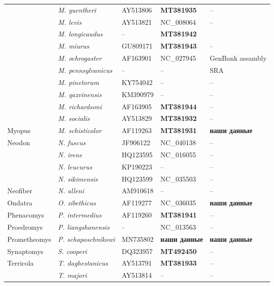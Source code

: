 \begin{landscape}
\begin{center}
\begin{longtable}{|p{3.5cm}|p{4.5cm}|p{4.0cm}|p{6.5cm}|p{4.5cm}|}
& \textit{M. guentheri} & AY513806 & \textbf{MT381935} & --\\ \cline{2-5}
& \textit{M. levis} & AY513821 & NC\_008064 & --\\ \cline{2-5}
& \textit{M. longicaudus} & -- & \textbf{MT381942} & \\ \cline{2-5}
& \textit{M. miurus} & GU809171 & \textbf{MT381943} & --\\ \cline{2-5}
& \textit{M. ochrogaster} & AF163901 & NC\_027945 & GenBank assambly\\ \cline{2-5}
& \textit{M. pennsylvanicus} & -- & -- & SRA\\ \cline{2-5}
& \textit{M. pinetorum} & KY754042 & -- & --\\ \cline{2-5}
& \textit{M. qazvinensis} & KM390979 & -- & --\\ \cline{2-5}
& \textit{M. richardsoni} & AF163905 & \textbf{MT381944} & --\\ \cline{2-5}
& \textit{M. socialis} & AY513829 & \textbf{MT381932} & --\\ \hline
Myopus & \textit{M. schisticolor} & AF119263 & \textbf{MT381931} & \textbf{наши данные}\\ \hline
\multirow{4}{*}{Neodon} & \textit{N. fuscus} & JF906122 & NC\_040138 & --\\ \cline{2-5}
& \textit{N. irene} & HQ123595 & NC\_016055 & --\\ \cline{2-5}
& \textit{N. leucurus} & KP190223 & -- & --\\ \cline{2-5}
& \textit{N. sikimensis} & HQ123599 & NC\_035503 & --\\ \hline
Neofiber & \textit{N. alleni} & AM910618 & -- & --\\ \hline
Ondatra & \textit{O. zibethicus} & AF119277 & NC\_036035 & \textbf{наши данные}\\ \hline
Phenacomys & \textit{P. intermedius} & AF119260 & \textbf{MT381941} & --\\ \hline
Proedromys & \textit{P. liangshanensis} & -- & NC\_013563 & --\\ \hline
Prometheomys & \textit{P. schaposchnikowi} & MN735802 & \textbf{наши данные} & \textbf{наши данные}\\ \hline
Synaptomys & \textit{S. cooperi} & DQ323957 & \textbf{MT492450} & --\\ \hline
\multirow{4}{*}{Terricola} & \textit{T. daghestanicus} & AY513791 & \textbf{MT381933} & --\\ \cline{2-5}
& \textit{T. majori} & AY513814 & -- & --\\ \cline{2-5}

\end{longtable}
\end{center}
\end{landscape}
